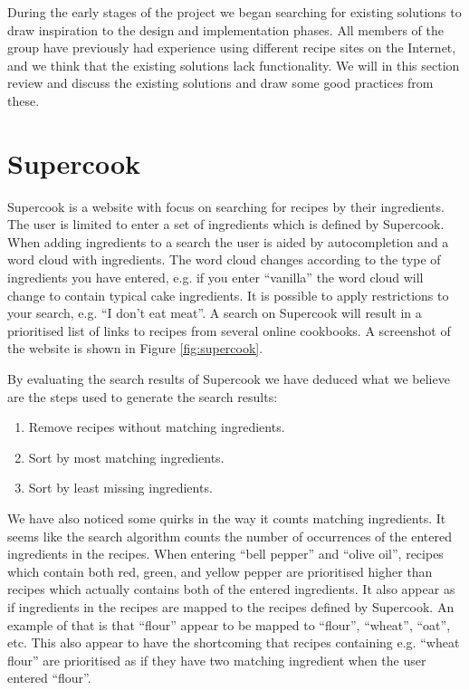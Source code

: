 During the early stages of the project we began searching for existing solutions to draw inspiration to the design and implementation phases. All members of the group have previously had experience using different recipe sites on the Internet, and we  think that the existing solutions lack functionality. We will in this section review and discuss the existing solutions and draw some good practices from these.  

\section{Supercook}
Supercook\cite{supercook} is a website with focus on searching for recipes by their ingredients. The user is limited to enter a set of ingredients which is defined by Supercook. When adding ingredients to a search the user is aided by autocompletion and a word cloud with ingredients. The word cloud changes according to the type of ingredients you have entered, e.g. if you enter ``vanilla'' the word cloud will change to contain typical cake ingredients. It is possible to apply restrictions to your search, e.g. ``I don't eat meat''. A search on Supercook will result in a prioritised list of links to recipes from several online cookbooks. A screenshot of the website is shown in Figure \ref{fig:supercook}.

By evaluating the search results of Supercook we have deduced what we believe are the steps used to generate the search results:
\begin{enumerate}
	\item Remove recipes without matching ingredients.
	\item Sort by most matching ingredients.
	\item Sort by least missing ingredients.
\end{enumerate}
We have also noticed some quirks in the way it counts matching ingredients. It seems like the search algorithm counts the number of occurrences of the entered ingredients in the recipes. When entering ``bell pepper'' and ``olive oil'', recipes which contain both red, green, and yellow pepper are prioritised higher than recipes which actually contains both of the entered ingredients. It also appear as if ingredients in the recipes are mapped to the recipes defined by Supercook. An example of that is that ``flour'' appear to be mapped to ``flour'', ``wheat'', ``oat'', etc. This also appear to have the shortcoming that recipes containing e.g. ``wheat flour'' are prioritised as if they have two matching ingredient when the user entered ``flour''.

